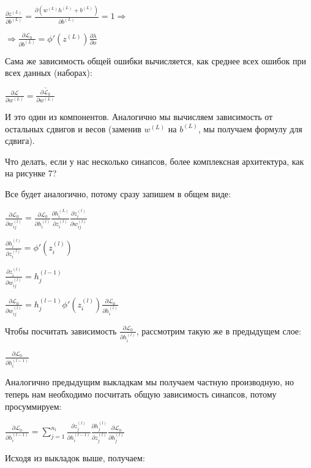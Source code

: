 \documentclass[12pt]{extarticle}
\begin{document}
	\centerline{$\frac{\partial z^{(L)}}{\partial b^{(L)}}= \frac{\partial(w^{(L)}h^{(L)}+b^{(L)})}{\partial b^{(L)}} = 1 \Rightarrow$}

	\centerline{$\Rightarrow \frac{\partial \mathcal{L}_0}{\partial b^{(L)}} = \phi'(z^{(L)})\frac{\partial \lambda}{\partial o}$}
	
	Сама же зависимость общей ошибки вычисляется, как среднее всех ошибок при всех данных (наборах):	

    \centerline{$\frac{\partial \mathcal{L}}{\partial w^{(L)}} = \overline{\frac{\partial  \mathcal{L}_k}{\partial w^{(L)}}}$}
	
	И это один из компонентов. Аналогично мы вычисляем зависимость от остальных сдвигов и весов (заменив $w^{(L)}$ на $b^{(L)}$, мы получаем  формулу для сдвига).
	
	Что делать, если у нас несколько синапсов, более комплексная архитектура, как на рисунке 7?
	
	Все будет аналогично, потому сразу запишем в общем виде:
	
	\centerline{$\frac{\partial \mathcal{L}_0}{\partial w_{ij}^{(l)}} = \frac{\partial \mathcal{L}_0}{\partial  h_i^{(l)}}\frac{\partial h_i^{(L)}}{\partial z_i^{(l)}}\frac{\partial z_i^{(l)}}{\partial w_{ij}^{(l)}}$}
	
	\centerline{$\frac{\partial h_i^{(l)}}{\partial z_i^{(l)}} = \phi'(z_i^{(l)})$}
	
	\centerline{$\frac{\partial z_i^{(l)}}{\partial w_{ij}^{(l)}} = h_j^{(l-1)}$}
	
	\centerline{$\frac{\partial \mathcal{L}_0}{\partial w_{ij}^{(l)}} = h_j^{(l-1)} \phi'(z_i^{(l)}) \frac{\partial \mathcal{L}_0}{\partial  h_i^{(l)}}$}
	
	Чтобы посчитать зависимость $\frac{\partial \mathcal{L}_0}{\partial  h_i^{(l)}}$, рассмотрим такую же в предыдущем слое:
	
	\centerline{$\frac{\partial \mathcal{L}_0}{\partial  h_i^{(l-1)}}$}
	
	Аналогично предыдущим выкладкам мы получаем частную производную, но теперь нам необходимо посчитать общую зависимость синапсов, потому просуммируем:
	
	\centerline{$\frac{\partial \mathcal{L}_0}{\partial  h_i^{(l-1)}} = \displaystyle \sum_{j = 1}^{n_l}\frac{\partial z_j^{(l)}}{\partial h_i^{(l-1)}}\frac{\partial h_j^{(l)}}{\partial z_j^{(l)}}\frac{\partial \mathcal{L}_0}{\partial  h_j^{(l)}} $}
	
	
	Исходя из выкладок выше, получаем:
	
\end{document}

